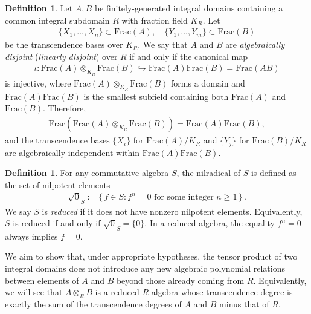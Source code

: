 \documentclass[11pt]{amsart}
\theoremstyle{definition}
\newtheorem{definition}[theorem]{Definition}
\theoremstyle{plain}
\theoremstyle{conclusion}
\begin{document}
\begin{definition} 
\label{def:algedis} \cite[Chapter VIII, Section 3]{LangAlgebra}
Let $A,B$ be finitely-generated integral domains containing a common integral subdomain $R$ with fraction field $K_R$. %
Let  \begin{align*}
    \{X_1,\ldots,X_n\}\subset\mathrm{Frac}(A),\quad \{Y_1,\ldots,Y_m\}\subset\mathrm{Frac}(B)
\end{align*} be the transcendence bases over $K_R$. %
We say that $A$ and $B$ are \textit{algebraically disjoint} (\textit{linearly disjoint}) over $R$ if and only if the canonical map \begin{align*}
\iota:   \mathrm{Frac}(A)\otimes_{K_R} \mathrm{Frac}(B) \hookrightarrow \mathrm{Frac}(A)\mathrm{Frac}(B) = \mathrm{Frac}(AB)
\end{align*} is injective, where $\mathrm{Frac}(A)\otimes_{K_R} \mathrm{Frac}(B)$ forms a domain and $ \mathrm{Frac}(A) \mathrm{Frac}(B)$ is the smallest subfield containing both $\mathrm{Frac}(A)$ and $\mathrm{Frac}(B)$. Therefore,  \begin{align*}
\mathrm{Frac}(\mathrm{Frac}(A)\otimes_{K_R} \mathrm{Frac}(B))=\mathrm{Frac}(A)\mathrm{Frac}(B),
\end{align*} and the transcendence bases $\{X_i\}$ for $\mathrm{Frac}(A)/K_R$ and $\{Y_j\}$ for $\mathrm{Frac}(B)/K_R$ are algebraically independent within $\mathrm{Frac}(A)\mathrm{Frac}(B)$.
\end{definition}

\begin{definition}
\label{def:redu} \cite[Chapter 1]{AtiyahMacdonald}
    For any commutative algebra $S$, the nilradical of $S$ is defined as the set of nilpotent elements \begin{align*}
   \sqrt{0}_S := \{\,f \in S : f^n = 0 \text{ for some integer } n \ge 1\,\}\,. 
\end{align*} We say $S$ is \textit{reduced} if it does not have nonzero nilpotent elements. Equivalently, $S$ is reduced if and only if $\sqrt{0}_S = \{0\}$. In a reduced algebra, the equality $f^n=0$ always implies $f=0$. 
\end{definition} 
  
We aim to show that, under appropriate hypotheses, the tensor product of two integral domains does not introduce any new algebraic polynomial relations between elements of $A$ and $B$ beyond those already coming from $R$. %
Equivalently, we will see that $A \otimes_R B$ is a reduced $R$-algebra whose transcendence degree is exactly the sum of the transcendence degrees of $A$ and $B$ minus that of $R$.  
\end{document}
